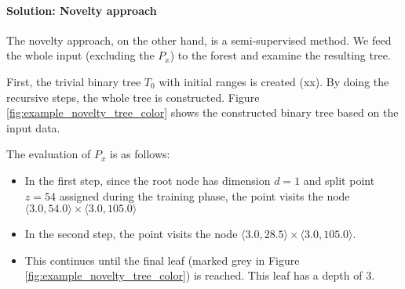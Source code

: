 \paragraph{Solution: Novelty approach}

The novelty approach, on the other hand, is a semi-supervised method. We feed the whole input (excluding the $P_x$) to the forest and examine the resulting tree.

First, the trivial binary tree $T_0$ with initial ranges is created (xx).
By doing the recursive steps, the whole tree is constructed.
Figure \ref{fig:example_novelty_tree_color} shows the constructed binary tree based on the input data.

The evaluation of $P_x$ is as follows:
\begin{itemize}
    \item In the first step, since the root node has dimension $d=1$ and split point $z = 54$ assigned during the training phase, the point visits the node $\langle 3.0, 54.0\rangle \times \langle 3.0, 105.0\rangle$
    \item In the second step, the point visits the node $\langle 3.0, 28.5\rangle \times \langle 3.0, 105.0\rangle$.
    \item This continues until the final leaf (marked grey in Figure \ref{fig:example_novelty_tree_color}) is reached. This leaf has a depth of 3.
    
\end{itemize}